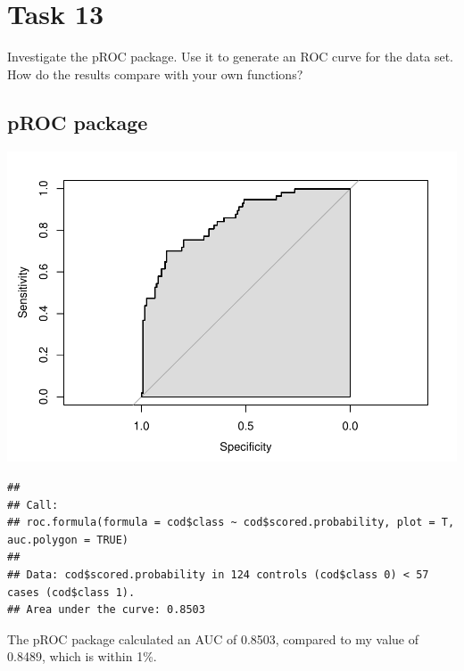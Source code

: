 \documentclass[]{article}
\newenvironment{Shaded}{\begin{snugshade}}{\end{snugshade}}
\newcommand{\KeywordTok}[1]{\textcolor[rgb]{0.13,0.29,0.53}{\textbf{#1}}}
\newcommand{\DataTypeTok}[1]{\textcolor[rgb]{0.13,0.29,0.53}{#1}}
\newcommand{\StringTok}[1]{\textcolor[rgb]{0.31,0.60,0.02}{#1}}
\newcommand{\OtherTok}[1]{\textcolor[rgb]{0.56,0.35,0.01}{#1}}
\newcommand{\OperatorTok}[1]{\textcolor[rgb]{0.81,0.36,0.00}{\textbf{#1}}}
\newcommand{\NormalTok}[1]{#1}
\begin{document}
\section{Task 13}\label{task-13}

Investigate the pROC package. Use it to generate an ROC curve for the
data set. How do the results compare with your own functions?

\subsection{pROC package}\label{proc-package}

\begin{Shaded}
\end{Shaded}

\includegraphics{DATA_621_Homework_2_files/figure-latex/proc-1.pdf}

\begin{verbatim}
## 
## Call:
## roc.formula(formula = cod$class ~ cod$scored.probability, plot = T,     auc.polygon = TRUE)
## 
## Data: cod$scored.probability in 124 controls (cod$class 0) < 57 cases (cod$class 1).
## Area under the curve: 0.8503
\end{verbatim}

The pROC package calculated an AUC of 0.8503, compared to my value of
0.8489, which is within 1\%.
\end{document}
